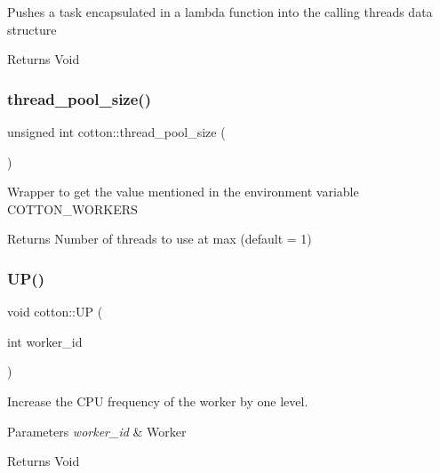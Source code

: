 Pushes a task encapsulated in a lambda function into the calling thread\textquotesingle{}s data structure

\begin{DoxyReturn}{Returns}
Void 
\end{DoxyReturn}
\mbox{\label{cotton-runtime_8h_file_a0b32dd3b6a3d126e107d5c77ec1f4cc3}} 
\subsubsection{\texorpdfstring{thread\+\_\+pool\+\_\+size()}{thread\_pool\_size()}}
{\footnotesize\ttfamily unsigned int cotton\+::thread\+\_\+pool\+\_\+size (\begin{DoxyParamCaption}{ }\end{DoxyParamCaption})}

Wrapper to get the value mentioned in the environment variable C\+O\+T\+T\+O\+N\+\_\+\+W\+O\+R\+K\+E\+RS

\begin{DoxyReturn}{Returns}
Number of threads to use at max (default = 1) 
\end{DoxyReturn}
\mbox{\label{cotton-runtime_8h_file_ae91d8cfb1b831a971eafccb512c17a15}} 
\subsubsection{\texorpdfstring{U\+P()}{UP()}\hspace{0.1cm}{\footnotesize\ttfamily [1/2]}}
{\footnotesize\ttfamily void cotton\+::\+UP (\begin{DoxyParamCaption}\item[{int}]{worker\+\_\+id }\end{DoxyParamCaption})}

Increase the C\+PU frequency of the worker by one level.


\begin{DoxyParams}{Parameters}
{\em worker\+\_\+id} & Worker\\
\hline
\end{DoxyParams}
\begin{DoxyReturn}{Returns}
Void 
\end{DoxyReturn}
\mbox{\label{cotton-runtime_8h_file_a7ed5b064cd66a53e2f01dc2c18c7e8d5}} 
